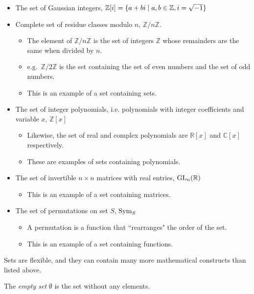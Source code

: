 \begin{itemize}
    \item The set of Gaussian integers, \(\mathbb{Z}[i]=\{a+bi\mid a,b\in\mathbb{Z},i=\sqrt{-1}\}\)
    \item Complete set of residue classes modulo \(n\), \(\mathbb{Z}/n\mathbb{Z}\).
    \begin{itemize}
        \item The element of \(\mathbb{Z}/n\mathbb{Z}\) is the set of integers \(\mathbb{Z}\) whose remainders are the same
        when divided by \(n\). 
        \item e.g.\ \(\mathbb{Z}/2\mathbb{Z}\) is the set containing the set of even numbers and the set of odd numbers.
        \item This is an example of a set containing sets.
    \end{itemize}
    \newpage
    \item The set of integer polynomials, i.e. polynomials with integer coefficients and variable \(x\), \(\mathbb{Z}[x]\)
    \begin{itemize}
        \item Likewise, the set of real and complex polynomials are \(\mathbb{R}[x]\) and \(\mathbb{C}[x]\) respectively.
        \item These are examples of sets containing polynomials.
    \end{itemize}
    \item The set of invertible \(n\times n\) matrices with real entries, \(\text{GL}_{n}(\mathbb{R})\)
    \begin{itemize}
        \item This is an example of a set containing matrices.
    \end{itemize}
    \item The set of permutations on set \(S\), \(\text{Sym}_{S}\)
    \begin{itemize}
        \item A permutation is a function that ``rearranges" the order of the set.
        \item This is an example of a set containing functions.
    \end{itemize}
\end{itemize}
Sets are flexible, and they can contain many more mathematical constructs than listed above.

\bigskip
\begin{definition}
    The \emph{empty set} \(\emptyset\) is the set without any elements. 
\end{definition}


